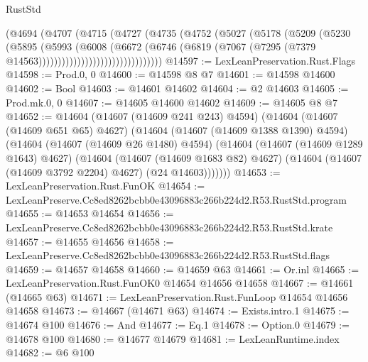 \begin{lexlean}{RustStd}
\begin{coremodule}
                              (@4694
                                (@4707
                                  (@4715
                                    (@4727
                                      (@4735
                                        (@4752
                                          (@5027
                                            (@5178
                                              (@5209
                                                (@5230
                                                  (@5895
                                                    (@5993
                                                      (@6008
                                                        (@6672
                                                          (@6746
                                                            (@6819
                                                              (@7067
                                                                (@7295
                                                                  (@7379
                                                                    @14563))))))))))))))))))))))))))))))))
@14597 := LexLeanPreservation.Rust.Flags
@14598 := Prod.{0, 0}
@14600 := @14598 @8 @7
@14601 := @14598 @14600
@14602 := Bool
@14603 := @14601 @14602
@14604 := @2 @14603
@14605 := Prod.mk.{0, 0}
@14607 := @14605 @14600 @14602
@14609 := @14605 @8 @7
@14652 := @14604
    (@14607 (@14609 @241 @243) @4594)
    (@14604
      (@14607 (@14609 @651 @65) @4627)
      (@14604
        (@14607 (@14609 @1388 @1390) @4594)
        (@14604
          (@14607 (@14609 @26 @1480) @4594)
          (@14604
            (@14607 (@14609 @1289 @1643) @4627)
            (@14604
              (@14607 (@14609 @1683 @82) @4627)
              (@14604 (@14607 (@14609 @3792 @2204) @4627) (@24 @14603)))))))
@14653 := LexLeanPreservation.Rust.FunOK
@14654 := LexLeanPreserve.Cc8ed8262bcbb0e43096883c266b224d2.R53.RustStd.program
@14655 := @14653 @14654
@14656 := LexLeanPreserve.Cc8ed8262bcbb0e43096883c266b224d2.R53.RustStd.krate
@14657 := @14655 @14656
@14658 := LexLeanPreserve.Cc8ed8262bcbb0e43096883c266b224d2.R53.RustStd.flags
@14659 := @14657 @14658
@14660 := @14659 @63
@14661 := Or.inl
@14665 := LexLeanPreservation.Rust.FunOK0 @14654 @14656 @14658
@14667 := @14661 (@14665 @63)
@14671 := LexLeanPreservation.Rust.FunLoop @14654 @14656 @14658
@14673 := @14667 (@14671 @63)
@14674 := Exists.intro.{1}
@14675 := @14674 @100
@14676 := And
@14677 := Eq.{1}
@14678 := Option.{0}
@14679 := @14678 @100
@14680 := @14677 @14679
@14681 := LexLeanRuntime.index
@14682 := @6 @100

\end{coremodule}
\end{lexlean}
